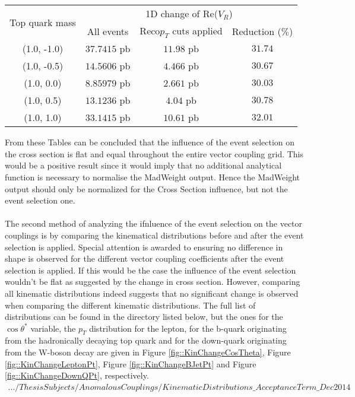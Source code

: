 \begin{table}[h!]
 \centering
 \begin{tabular}{|c|c|c|c|}
  \hline
  \multirow{2}{*}{Top quark mass} 	& \multicolumn{3}{|c|}{1D change of Re($V_R$)}  			\\
					& All events	& Reco$p_T$ cuts applied	& Reduction ($\%$) 	\\
  \hline
    (1.0, -1.0)				& $37.7415$ pb	& $11.98$ pb			& $31.74$		\\
    (1.0, -0.5)				& $14.5606$ pb	& $4.466$ pb			& $30.67$		\\
    (1.0,  0.0)				& $8.85979$ pb	& $2.661$ pb			& $30.03$		\\
    (1.0,  0.5)				& $13.1236$ pb	& $4.04$ pb			& $30.78$		\\
    (1.0,  1.0)				& $33.1415$ pb	& $10.61$ pb			& $32.01$		\\
  \hline 
 \end{tabular} 
 \caption{} \label{table::XSChangeAccVR}
\end{table}

From these Tables can be concluded that the influence of the event selection on the cross section is flat and equal throughout the entire vector coupling grid. This would be a positive result since it would imply that no additional analytical function is necessary to normalise the MadWeight output. Hence the MadWeight output should only be normalized for the Cross Section influence, but not the event selection one.\\
\\
The second method of analyzing the ifnluence of the event selection on the vector couplings is by comparing the kinematical distributions before and after the event selection is applied. Special attention is awarded to ensuring no difference in shape is observed for the different vector coupling coefficients after the event selection is applied. If this would be the case the influence of the event selection wouldn't be flat as suggested by the change in cross section. However, comparing all kinematic distributions indeed suggests that no significant change is observed when comparing the different kinematic distributions. The full list of distributions can be found in the directory listed below, but the ones for the $\cos \theta^{*}$ variable, the $p_T$ distribution for the lepton, for the b-quark originating from the hadronically decaying top quark and for the down-quark originating from the W-boson decay are given in Figure \ref{fig::KinChangeCosTheta}, Figure \ref{fig::KinChangeLeptonPt}, Figure \ref{fig::KinChangeBJetPt} and Figure \ref{fig::KinChangeDownQPt}, respectively.
\begin{eqnarray*}
 .../ThesisSubjects/AnomalousCouplings/KinematicDistributions\_AcceptanceTerm\_Dec2014 \\
\end{eqnarray*}


